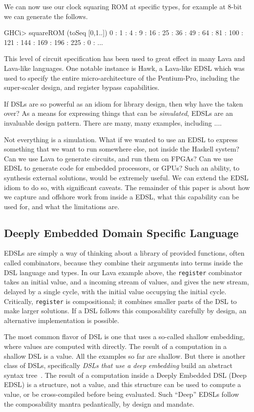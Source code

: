 \documentclass[11pt]{article}
\begin{document}
We can now use our clock squaring ROM at specific types,
for example at 8-bit we can generate the follows.
\begin{Code}
GHCi> squareROM (toSeq [0,1..])        
0 : 1 : 4 : 9 : 16 : 25 : 36 : 49 : 64 : 81 : 100 : 121 : 144 : 169 : 196 : 225 : 0 : ...
\end{Code}

This level of circuit specification has been used to great
effect in many Lava and Lava-like languages. One notable
instance is Hawk, a Lava-like EDSL which was used to specify
the entire micro-architecture of the Pentium-Pro, including the
super-scaler design, and register bypass capabilities.

If DSLs are so powerful as an idiom for library design, then why have the taken over?
As a means for expressing things that can be {\em simulated\/}, EDSLs are an invaluable
design pattern. There are many, many examples, including ....

Not everything is a simulation. What if we wanted to use an EDSL to express
something that we want to run somewhere else, not inside the Haskell system?
Can we use Lava to generate circuits, and run them on FPGAs? Can we use EDSL
to generate code for embedded processors, or GPUs? Such an ability, to 
synthesis external solutions, would be extremely useful. We can extend
the EDSL idiom to do so, with significant caveats. The remainder of this
paper is about how we capture and offshore work from inside a EDSL, what
this capability can be used for, and what the limitations are.

\subsection{Deeply Embedded Domain Specific Language}

EDSLs are simply a way of thinking about a library
of provided functions, often called combinators, because they combine
their arguments into terms inside the DSL language and types. In our
Lava example above, the \verb|register| combinator takes an initial
value, and a incoming stream of values, and gives the new stream,
delayed by a single cycle, with the initial value occupying the initial
cycle. Critically, \verb|register| is compositional; it combines
smaller parts of the DSL to make larger solutions. If a DSL
follows this composability carefully by design, an alternative implementation
is possible.

The most common flavor of DSL is one  that uses a so-called shallow embedding, where values are computed with directly.
The result of a computation in a shallow DSL is a value. All the examples so far are shallow.
But there is another class of DSLs, 
specifically {\em DSLs that use a deep embedding\/} build an abstract syntax tree~\cite{Elliott:03:CompileDSEL-JFP}.
The result of a computation inside a Deeply Embedded DSL (Deep EDSL)
is a structure, not a value, and this structure can be used to compute a value,
or be cross-compiled before being evaluated. Such ``Deep'' EDSLs
follow the composability mantra pedantically, by design and mandate.
\end{document}
